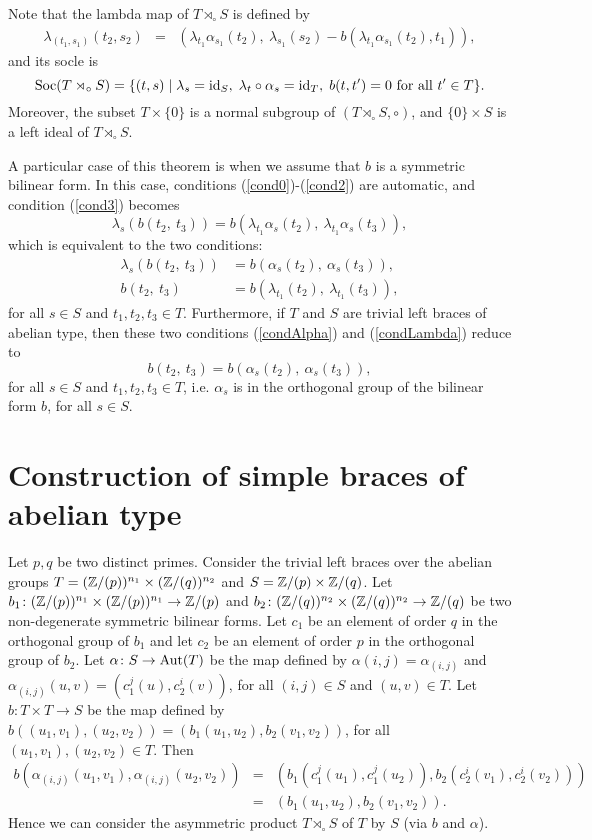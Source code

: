 Note that the lambda map of $T\rtimes_\circ S$ is defined by
\begin{eqnarray} \label{deflambda}
	\lambda_{(t_1,s_1)}(t_2,s_2)&=&
	\left(
	\lambda_{t_1}\alpha_{s_1}(t_2),~
	\lambda_{s_1}(s_2)-b(\lambda_{t_1}\alpha_{s_1}(t_2),t_1)
	\right),
\end{eqnarray}
and its socle is
$$
\operatorname{Soc}(T\rtimes_\circ S)=\{(t,s)\mid \lambda_s=\operatorname{id}_S,\;\lambda_t\circ
\alpha_s=\operatorname{id}_T,\; b(t,t')=0\mbox{ for all }t'\in T\}.
$$
Moreover, the subset $T\times\{0\}$ is a normal subgroup of $(T\rtimes_\circ S,\circ)$, and $\{0\}\times S$ is a left
ideal of $T\rtimes_\circ S$.

A particular case of this theorem is when we assume that $b$ is a symmetric bilinear form. In this case, conditions
(\ref{cond0})-(\ref{cond2}) are automatic, and
condition (\ref{cond3}) becomes
$$
\lambda_s(b(t_2,~t_3))=b(\lambda_{t_1}\alpha_{s}(t_2),~\lambda_{t_1}\alpha_{s}(t_3)),
$$
which is equivalent to the two conditions:
\begin{align}
	\lambda_s(b(t_2,~t_3))&=b(\alpha_{s}(t_2),~\alpha_{s}(t_3)),\label{condAlpha} \\
	b(t_2,~t_3)&=b(\lambda_{t_1}(t_2),~\lambda_{t_1}(t_3)),\label{condLambda}
\end{align}
for all $s\in S$ and $t_1,t_2,t_3\in T$.
Furthermore, if $T$ and $S$ are trivial left braces of abelian type, then these two conditions (\ref{condAlpha}) and (\ref{condLambda}) reduce to 
$$b(t_2,~t_3)=b(\alpha_{s}(t_2),~\alpha_{s}(t_3)),$$
for all $s\in S$ and $t_1,t_2,t_3\in T$, i.e. $\alpha_s$ is in the orthogonal group of the bilinear form $b$, for all $s\in S$.
   
\section*{Construction of simple braces of abelian type}

Let $p,q$ be two distinct primes. Consider the trivial left braces over the abelian groups $T=(\mathbb{Z}/(p))^{n_1}\times (\mathbb{Z}/(q))^{n_2}$ and $S=\mathbb{Z}/(p)\times \mathbb{Z}/(q)$. Let $b_1\colon (\mathbb{Z}/(p))^{n_1}\times (\mathbb{Z}/(p))^{n_1}\rightarrow \mathbb{Z}/(p)$ and $b_2\colon (\mathbb{Z}/(q))^{n_2}\times (\mathbb{Z}/(q))^{n_2}\rightarrow \mathbb{Z}/(q)$ be two non-degenerate symmetric bilinear forms. Let $c_1$ be an element of order $q$ in the orthogonal group of $b_1$ and let $c_2$ be an element of order $p$ in the orthogonal group of $b_2$. Let $\alpha\colon S\rightarrow \operatorname{Aut}(T)$ be the map defined by $\alpha(i,j)=\alpha_{(i,j)}$ and $\alpha_{(i,j)}(u,v)=(c_1^{j}(u),c_2^{i}(v))$, for all $(i,j)\in S$ and $(u,v)\in T$. Let $b\colon T\times T\rightarrow S$ be the map defined by $b((u_1,v_1),(u_2,v_2))=(b_1(u_1,u_2),b_2(v_1,v_2))$, for all $(u_1,v_1),(u_2,v_2)\in T$. Then
\begin{eqnarray*}b(\alpha_{(i,j)}(u_1,v_1),\alpha_{(i,j)}(u_2,v_2))&=&(b_1(c_1^{j}(u_1),c_1^{j}(u_2)),b_2(c_2^{i}(v_1),c_2^{i}(v_2)))\\
	&=&(b_1(u_1,u_2),b_2(v_1,v_2)).
\end{eqnarray*}
Hence we can consider the asymmetric product $T\rtimes_{\circ}S$ of $T$ by $S$ (via $b$ and $\alpha$). 

